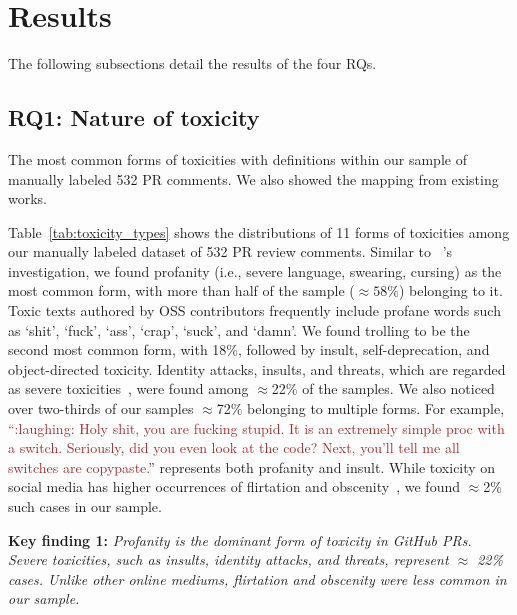 \section{Results}
\label{sec:results}


The following subsections detail the results of the four RQs.


\subsection{RQ1: Nature of toxicity}
\label{sec:results_rq1}
\begin{table*}
    \caption{The most common forms of toxicities with definitions within our sample of manually labeled 532 PR comments. We also showed the mapping from existing works.}
\label{tab:toxicity_types}
    \centering

\end{table*}


Table~\ref{tab:toxicity_types} shows the distributions of 11 forms of toxicities among our manually labeled dataset of 532 PR review comments.
Similar to ~\citet{miller2022did}'s investigation, we found profanity (i.e., severe language, swearing, cursing) as the most common form, with more than half of the sample ($\approx 58\%$) belonging to it. 
Toxic texts authored by OSS contributors frequently include profane words such as `shit', `fuck', `ass', `crap', `suck', and `damn'.
We found trolling to be the second most common form, with 18\%, followed by insult, self-deprecation, and object-directed toxicity. 
Identity attacks, insults, and threats, which are regarded as severe toxicities~\cite{goyal2022your}, were found among $\approx$22\% of the samples.
We also noticed over two-thirds of our samples $\approx$72\% belonging to multiple forms.  For example, \textcolor{brown}{“:laughing: Holy shit, you are fucking stupid. It is an extremely simple proc with a switch. Seriously, did you even look at the code? Next, you'll tell me all switches are copypaste.}” represents both profanity and insult. 
While toxicity on social media has higher occurrences of flirtation and obscenity~\cite{gunasekara2018review,goyal2022your}, we found $\approx$2\% such cases in our sample.


\begin{boxedtext}
\textbf{Key finding 1:} \emph{Profanity is the dominant form of toxicity in GitHub PRs. Severe toxicities, such as insults, identity attacks, and threats, represent $\approx$ 22\% cases. Unlike other online mediums, flirtation and obscenity were less common in our sample. }
\end{boxedtext}

